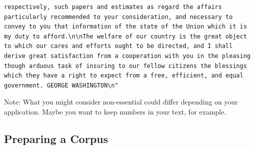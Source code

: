 \documentclass[
  letterpaper,
  DIV=11,
  numbers=noendperiod]{scrreprt}
\newenvironment{Shaded}{\begin{snugshade}}{\end{snugshade}}
\newcommand{\AttributeTok}[1]{\textcolor[rgb]{0.40,0.45,0.13}{#1}}
\newcommand{\CommentTok}[1]{\textcolor[rgb]{0.37,0.37,0.37}{#1}}
\newcommand{\DocumentationTok}[1]{\textcolor[rgb]{0.37,0.37,0.37}{\textit{#1}}}
\newcommand{\FunctionTok}[1]{\textcolor[rgb]{0.28,0.35,0.67}{#1}}
\newcommand{\NormalTok}[1]{\textcolor[rgb]{0.00,0.23,0.31}{#1}}
\newcommand{\OtherTok}[1]{\textcolor[rgb]{0.00,0.23,0.31}{#1}}
\newcommand{\SpecialCharTok}[1]{\textcolor[rgb]{0.37,0.37,0.37}{#1}}
\newcommand{\StringTok}[1]{\textcolor[rgb]{0.13,0.47,0.30}{#1}}
\begin{document}
\begin{verbatim}
respectively, such papers and estimates as regard the affairs particularly recommended to your consideration, and necessary to convey to you that information of the state of the Union which it is my duty to afford.\n\nThe welfare of our country is the great object to which our cares and efforts ought to be directed, and I shall derive great satisfaction from a cooperation with you in the pleasing though arduous task of insuring to our fellow citizens the blessings which they have a right to expect from a free, efficient, and equal government. GEORGE WASHINGTON\n"
\end{verbatim}

\begin{Shaded}
\end{Shaded}

Note: What you might consider non-essential could differ depending on
your application. Maybe you want to keep numbers in your text, for
example.

\hypertarget{preparing-a-corpus}{%
\subsection{Preparing a Corpus}\label{preparing-a-corpus}}

\begin{Shaded}
\end{Shaded}
\end{document}
